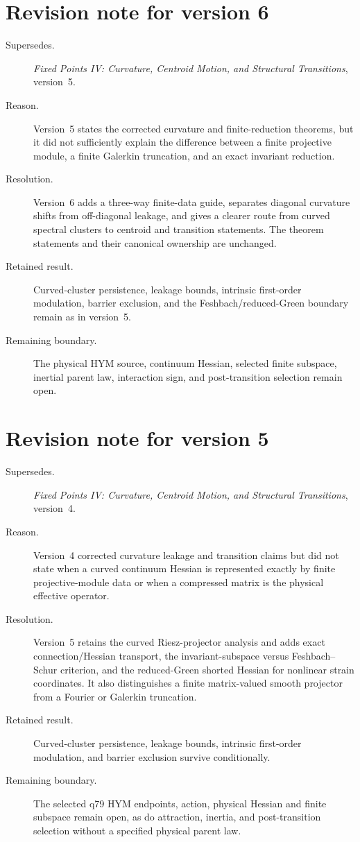 \documentclass[11pt]{article}
\begin{document}
\section*{Revision note for version 6}
\begin{description}
\item[Supersedes.] \emph{Fixed Points IV: Curvature, Centroid Motion, and
Structural Transitions}, version~5.
\item[Reason.] Version~5 states the corrected curvature and finite-reduction
theorems, but it did not sufficiently explain the difference between a finite
projective module, a finite Galerkin truncation, and an exact invariant
reduction.
\item[Resolution.] Version~6 adds a three-way finite-data guide, separates
diagonal curvature shifts from off-diagonal leakage, and gives a clearer
route from curved spectral clusters to centroid and transition statements.
The theorem statements and their canonical ownership are unchanged.
\item[Retained result.] Curved-cluster persistence, leakage bounds, intrinsic
first-order modulation, barrier exclusion, and the Feshbach/reduced-Green
boundary remain as in version~5.
\item[Remaining boundary.] The physical HYM source, continuum Hessian,
selected finite subspace, inertial parent law, interaction sign, and
post-transition selection remain open.
\end{description}

\section*{Revision note for version 5}
\begin{description}
\item[Supersedes.] \emph{Fixed Points IV: Curvature, Centroid Motion, and
Structural Transitions}, version~4.
\item[Reason.] Version~4 corrected curvature leakage and transition claims but
did not state when a curved continuum Hessian is represented exactly by finite
projective-module data or when a compressed matrix is the physical effective
operator.
\item[Resolution.] Version~5 retains the curved Riesz-projector analysis and
adds exact connection/Hessian transport, the invariant-subspace versus
Feshbach--Schur criterion, and the reduced-Green shorted Hessian for nonlinear
strain coordinates. It also distinguishes a finite matrix-valued smooth
projector from a Fourier or Galerkin truncation.
\item[Retained result.] Curved-cluster persistence, leakage bounds, intrinsic
first-order modulation, and barrier exclusion survive conditionally.
\item[Remaining boundary.] The selected q79 HYM endpoints, action, physical
Hessian and finite subspace remain open, as do attraction, inertia, and
post-transition selection without a specified physical parent law.
\end{description}
\end{document}
